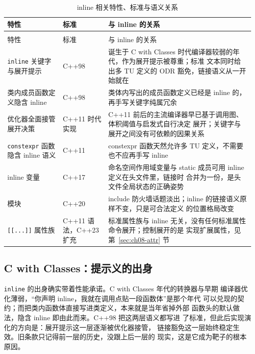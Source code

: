 \documentclass[12pt,a4paper,fontset=fandol]{ctexbook}
\newcommand{\cpp}[1]{C++#1}
\newcommand{\Tp}[1]{\texttt{#1}}
\begin{document}
\begin{longtable}{
  >{\raggedright\arraybackslash}p{}
  >{\raggedright\arraybackslash}p{}
  >{\raggedright\arraybackslash}p{}}
\caption{inline 相关特性、标准与语义关系}\label{tab:ch08-standardline}\\
\toprule
特性 & 标准 & 与 inline 的关系 \\
\midrule
\endfirsthead
\multicolumn{3}{l}{\footnotesize 表~\ref{tab:ch08-standardline}（续）}\\
\toprule
特性 & 标准 & 与 inline 的关系 \\
\midrule
\endhead
\bottomrule
\endlastfoot
\Tp{inline} 关键字与展开提示 & \cpp{98} &
诞生于 C with Classes 时代编译器较弱的年代，作为展开提示被尊重；标准
文本同时给出多 TU 定义的 ODR 豁免，链接语义从一开始就在 \\
类内成员函数定义隐含 inline & \cpp{98} &
类体内写出的成员函数定义已经是 inline 的，再手写关键字纯属冗余 \\
优化器全面接管展开决策 & \cpp{11} 时代实现 &
\cpp{11} 前后的主流编译器早已基于调用图、体积阈值与启发式自行决定
展开；关键字与展开之间没有可依赖的因果关系 \\
\Tp{constexpr} 函数隐含 inline 语义 & \cpp{11} &
constexpr 函数天然允许多 TU 定义，不需要也不应再手写 inline \\
inline 变量 & \cpp{17} &
命名空间作用域变量与 static 成员可用 inline 定义在头文件里，链接时
合并为一份，是头文件全局状态的正确姿势 \\
模块 & \cpp{20} &
include 防火墙话题淡出；inline 的链接语义原样不变，只是可合法定义
的位置格局改变 \\
\Tp{[[...]]} 属性族 & \cpp{11} 语法，\cpp{23} 扩充 &
标准属性族与 inline 无关，没有任何标准属性命令展开；控制展开的是
实现扩展属性，见第~\ref{sec:ch08-attr} 节 \\
\end{longtable}

\subsection{C with Classes：提示义的出身}
\label{sec:ch08-cwc}

\Tp{inline} 的出身确实带着性能承诺。C with Classes 年代的转换器与早期
编译器优化薄弱，``你声明 inline，我就在调用点贴一段函数体''是那个年代
可以兑现的契约；而把类内函数体直接写进类定义，本来就是当年省掉外部
函数头的默认做法，隐含 inline 即由此而来。\cpp{98} 把这两层语义都写进
了标准，但此后实现演化的方向是：展开提示这一层逐渐被优化器接管，
链接豁免这一层始终稳定生效。旧条款只记得前一层的历史，没跟上后一层的
现实，这是它成为靶子的根本原因。
\end{document}
